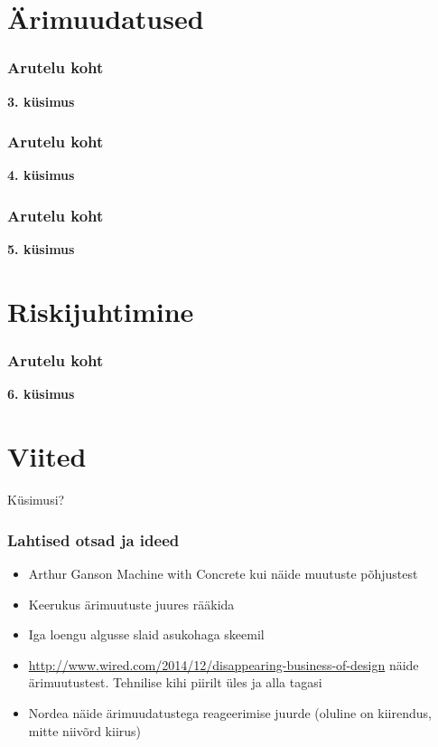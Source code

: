 \section{Ärimuudatused}
\begin{frame}[fragile]
  \frametitle{Arutelu koht}
		\begin{center}
			\textbf{3. küsimus}
		\end{center}
\end{frame}

\begin{frame}[fragile]
  \frametitle{Arutelu koht}
		\begin{center}
			\textbf{4. küsimus}
		\end{center}
\end{frame}

\begin{frame}[fragile]
  \frametitle{Arutelu koht}
		\begin{center}
			\textbf{5. küsimus}
		\end{center}
\end{frame}

\section{Riskijuhtimine}
\begin{frame}[fragile]
  \frametitle{Arutelu koht}
		\begin{center}
			\textbf{6. küsimus}
		\end{center}
\end{frame}


\section{Viited}

\begin{frame}[t,allowframebreaks,]
  	
	 

\end{frame}

\begin{frame}[plain]
	\begin{center}Küsimusi?\end{center}
\end{frame}

\begin{frame}[fragile]
  \frametitle{Lahtised otsad ja ideed}
	\begin{itemize}
		\item Arthur Ganson Machine with Concrete kui näide muutuste põhjustest
		\item Keerukus ärimuutuste juures rääkida
		\item Iga loengu algusse slaid asukohaga skeemil
		\item \url{http://www.wired.com/2014/12/disappearing-business-of-design} näide ärimuutustest. Tehnilise kihi piirilt üles ja alla tagasi
		\item Nordea näide ärimuudatustega reageerimise juurde (oluline on kiirendus, mitte niivõrd kiirus)
	\end{itemize}
\end{frame}


